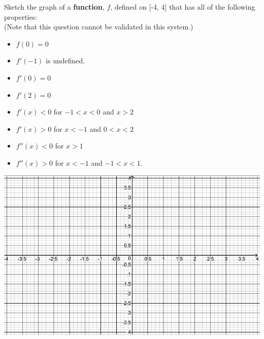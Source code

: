 \documentclass[handout]{ximera}
\begin{document}
\begin{problem}
Sketch the graph of a \textbf{function}, $f$, defined on [-4, 4] that has all of the following properties:
\\(Note that this question cannot be validated in this system.)
\begin{itemize}
	\item $f(0)=0$
	\medskip
	\item $f'(-1)$ is undefined.
	\medskip
	\item $f'(0)=0$
	\medskip
	\item $f'(2)=0$
	\medskip
	\item $f'(x)<0$ for $-1<x<0$ \hspace{0.1in} and  \hspace{0.1in} $x>2$
	\medskip
	\item $f'(x)>0$ for $x<-1$ \hspace{0.1in} and  \hspace{0.1in} $0<x<2$
	\medskip
	\item $f''(x)<0$ for $x>1$
	\medskip
	\item $f''(x)>0$ for $x<-1$  \hspace{0.1in} and \hspace{0.1in} $-1<x<1$.
	\end{itemize}
\end{problem}
\includegraphics [scale=0.7]{Axis-Ex3.png} %
\end{document}
